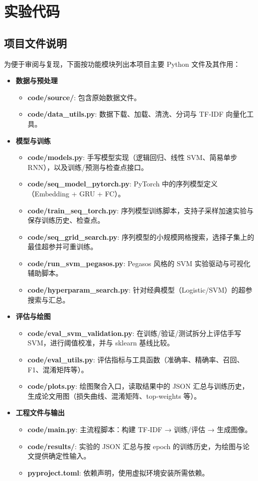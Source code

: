 \chapter{实验代码}
\section{项目文件说明}
为便于审阅与复现，下面按功能模块列出本项目主要 Python 文件及其作用：
\begin{itemize}
	\item \textbf{数据与预处理}
	\begin{itemize}
		\item \textbf{code/source/}: 包含原始数据文件。
		\item \textbf{code/data\_utils.py}: 数据下载、加载、清洗、分词与 TF‑IDF 向量化工具。
	\end{itemize}
	\item \textbf{模型与训练}
	\begin{itemize}
		\item \textbf{code/models.py}: 手写模型实现（逻辑回归、线性 SVM、简易单步 RNN），以及训练/预测与检查点接口。
		\item \textbf{code/seq\_model\_pytorch.py}: PyTorch 中的序列模型定义（Embedding + GRU + FC）。
		\item \textbf{code/train\_seq\_torch.py}: 序列模型训练脚本，支持子采样加速实验与保存训练历史、检查点。
		\item \textbf{code/seq\_grid\_search.py}: 序列模型的小规模网格搜索，选择子集上的最佳超参并可重训练。
		\item \textbf{code/run\_svm\_pegasos.py}: Pegasos 风格的 SVM 实验驱动与可视化辅助脚本。
		\item \textbf{code/hyperparam\_search.py}: 针对经典模型（Logistic/SVM）的超参搜索与汇总。
	\end{itemize}
	\item \textbf{评估与绘图}
	\begin{itemize}
		\item \textbf{code/eval\_svm\_validation.py}: 在训练/验证/测试拆分上评估手写 SVM，进行阈值校准，并与 sklearn 基线比较。
		\item \textbf{code/eval\_utils.py}: 评估指标与工具函数（准确率、精确率、召回、F1、混淆矩阵等）。
		\item \textbf{code/plots.py}: 绘图聚合入口，读取结果中的 JSON 汇总与训练历史，生成论文用图（损失曲线、混淆矩阵、top‑weights 等）。
	\end{itemize}
	\item \textbf{工程文件与输出}
	\begin{itemize}
		\item \textbf{code/main.py}: 主流程脚本：构建 TF‑IDF → 训练/评估 → 生成图像。
		\item \textbf{code/results/}: 实验的 JSON 汇总与按 epoch 的训练历史，为绘图与论文提供确定性输入。
		\item \textbf{pyproject.toml}: 依赖声明，使用虚拟环境安装所需依赖。
	\end{itemize}
\end{itemize}


